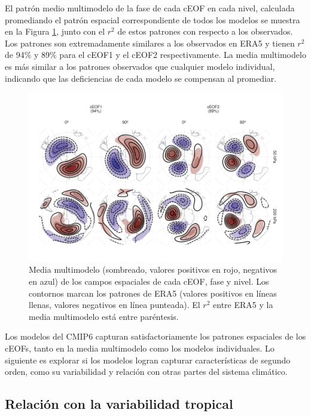 \documentclass[12pt,oneside,a4paper]{reedthesis}
\begin{document}
El patrón medio multimodelo de la fase de cada cEOF en cada nivel, calculada promediando el patrón espacial correspondiente de todos los modelos se muestra en la Figura \ref{fig:mmm}, junto con el \(r^2\) de estos patrones con respecto a los observados.
Los patrones son extremadamente similares a los observados en ERA5 y tienen \(r^2\) de 94\% y 89\% para el cEOF1 y el cEOF2 respectivamente.
La media multimodelo es más similar a los patrones observados que cualquier modelo individual, indicando que las deficiencias de cada modelo se compensan al promediar.

\begin{figure}

{\centering \includegraphics{figures/50-cmip6/mmm-1} 

}

\caption{Media multimodelo (sombreado, valores positivos en rojo, negativos en azul) de los campos espaciales de cada cEOF, fase y nivel. Los contornos marcan los patrones de ERA5 (valores positivos en líneas llenas, valores negativos en línea punteada). El \(r^2\) entre ERA5 y la media multimodelo está entre paréntesis.}\label{fig:mmm}
\end{figure}



Los modelos del CMIP6 capturan satisfactoriamente los patrones espaciales de los cEOFs, tanto en la media multimodelo como los modelos individuales.
Lo siguiente es explorar si los modelos logran capturar características de segundo orden, como su variabilidad y relación con otras partes del sistema climático.

\hypertarget{relaciuxf3n-con-la-variabilidad-tropical}{%
\subsection{Relación con la variabilidad tropical}\label{relaciuxf3n-con-la-variabilidad-tropical}}
\end{document}
